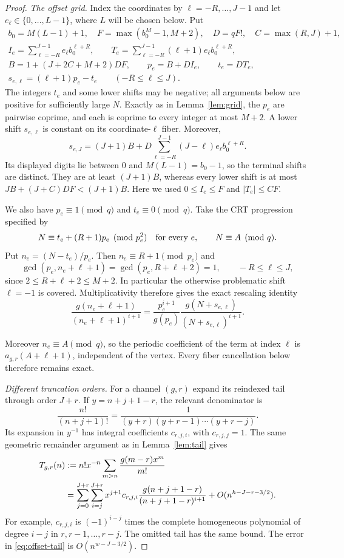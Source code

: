 \begin{proof}
\emph{The offset grid.}
Index the coordinates by $\ell=-R,\ldots,J-1$ and let
$e_\ell\in\{0,\ldots,L-1\}$, where $L$ will be chosen below. Put
\begin{gather*}
 b_0=M(L-1)+1,\quad F=\max(b_0^M-1,M+2),\quad D=qF!,
 \quad C=\max(R,J)+1,\\
 I_e=\sum_{\ell=-R}^{J-1}e_\ell b_0^{\ell+R},\qquad
 T_e=\sum_{\ell=-R}^{J-1}(\ell+1)e_\ell b_0^{\ell+R},\\
 B=1+(J+2C+M+2)DF,\qquad
 p_e=B+DI_e,\qquad t_e=DT_e,\\
 s_{e,\ell}=(\ell+1)p_e-t_e\qquad(-R\leq\ell\leq J).
\end{gather*}
The integers $t_e$ and some lower shifts may be negative; all arguments
below are positive for sufficiently large $N$.
Exactly as in Lemma~\ref{lem:grid}, the $p_e$ are pairwise coprime,
and each is coprime to every integer at most $M+2$.  A lower shift
$s_{e,\ell}$ is constant on its coordinate-$\ell$ fiber.  Moreover,
\[
 s_{e,J}=(J+1)B+
 D\sum_{\ell=-R}^{J-1}(J-\ell)e_\ell b_0^{\ell+R}.
\]
Its displayed digits lie between $0$ and $M(L-1)=b_0-1$, so the
terminal shifts are distinct.  They are at least $(J+1)B$, whereas
every lower shift is at most $JB+(J+C)DF<(J+1)B$.
Here we used $0\leq I_e\leq F$ and $|T_e|\leq CF$.

We also have $p_e\equiv1\pmod q$ and $t_e\equiv0\pmod q$.
Take the CRT progression specified by
\[
 N\equiv t_e+(R+1)p_e\pmod {p_e^2}\quad\hbox{for every }e,
 \qquad N\equiv A\pmod q.
\]
Put $n_e=(N-t_e)/p_e$.
Then $n_e\equiv R+1\pmod{p_e}$ and
\[
 \gcd(p_e,n_e+\ell+1)=\gcd(p_e,R+\ell+2)=1,
 \qquad -R\leq\ell\leq J,
\]
since $2\leq R+\ell+2\leq M+2$.  In particular the otherwise
problematic shift $\ell=-1$ is covered.  Multiplicativity therefore gives
the exact rescaling identity
\[
 \frac{g(n_e+\ell+1)}{(n_e+\ell+1)^{i+1}}
 =\frac{p_e^{i+1}}{g(p_e)}
   \frac{g(N+s_{e,\ell})}{(N+s_{e,\ell})^{i+1}}.
\]

Moreover $n_e\equiv A\pmod q$, so the periodic coefficient of the term
at index $\ell$ is $a_{g,r}(A+\ell+1)$, independent of the vertex.
Every fiber cancellation below therefore remains exact.

\emph{Different truncation orders.}
For a channel $(g,r)$ expand its reindexed tail through order $J+r$.
If $y=n+j+1-r$, the relevant denominator is
\[
 \frac{n!}{(n+j+1)!}
 =\frac1{(y+r)(y+r-1)\cdots(y+r-j)}.
\]
Its expansion in $y^{-1}$ has integral coefficients $c_{r,j,i}$,
with $c_{r,j,j}=1$.  The same geometric remainder argument as in
Lemma~\ref{lem:tail} gives
\begin{align}
 T_{g,r}(n)&:=n!x^{-n}
       \sum_{m>n}\frac{g(m-r)x^m}{m!}\notag\\
 &=\sum_{j=0}^{J+r}\sum_{i=j}^{J+r}
       x^{j+1}c_{r,j,i}
       \frac{g(n+j+1-r)}{(n+j+1-r)^{i+1}}
       +O(n^{h-J-r-3/2}).
 \label{eq:offset-tail}
\end{align}
For example, $c_{r,j,i}$ is $(-1)^{i-j}$ times the complete
homogeneous polynomial of degree $i-j$ in $r,r-1,\ldots,r-j$.
The omitted tail has the same bound.  The error in
\eqref{eq:offset-tail} is $O(n^{w-J-3/2})$.


\end{proof}
